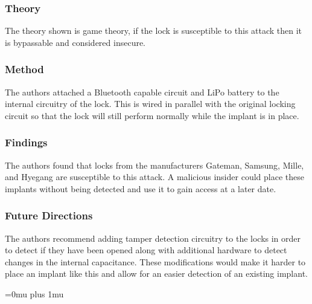 \subsubsection{Theory}

\noindent
The theory shown is game theory, if the lock is susceptible to this attack then it is bypassable and considered insecure.

\subsubsection{Method}

\noindent
The authors attached a Bluetooth capable circuit and LiPo battery to the internal circuitry of the lock.  This is wired in parallel with the original locking circuit so that the lock will still perform normally while the implant is in place.

\subsubsection{Findings}

\noindent
The authors found that locks from the manufacturers Gateman, Samsung, Mille, and Hyegang are susceptible to this attack.  A malicious insider could place these implants without being detected and use it to gain access at a later date.

\subsubsection{Future Directions}

\noindent
The authors recommend adding tamper detection circuitry to the locks in order to detect if they have been opened along with additional hardware to detect changes in the internal capacitance.  These modifications would make it harder to place an implant like this and allow for an easier detection of an existing implant.

\Urlmuskip=0mu plus 1mu\relax
\pagebreak
